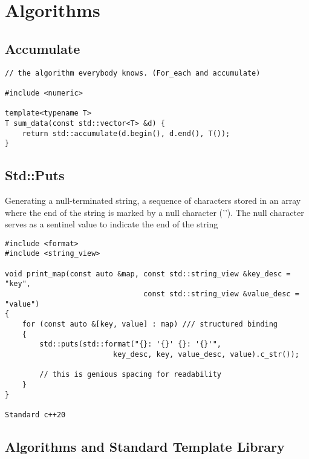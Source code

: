 \section{Algorithms}

\subsection{Accumulate}

\begin{verbatim}
// the algorithm everybody knows. (For_each and accumulate)

#include <numeric>

template<typename T>
T sum_data(const std::vector<T> &d) {
    return std::accumulate(d.begin(), d.end(), T());
}
\end{verbatim}

\subsection{Std::Puts}

Generating a null-terminated string,  a sequence of characters stored in an array
where the end of the string is marked by a null character ('\0'). 
The null character serves as a sentinel value to indicate the end of the string

\begin{verbatim}
#include <format>
#include <string_view>

void print_map(const auto &map, const std::string_view &key_desc = "key",
                                const std::string_view &value_desc = "value")
{
    for (const auto &[key, value] : map) /// structured binding
    {
        std::puts(std::format("{}: '{}' {}: '{}'",
                         key_desc, key, value_desc, value).c_str());

        // this is genious spacing for readability
    }
}

Standard c++20
\end{verbatim}
\subsection{Algorithms and Standard Template Library}


